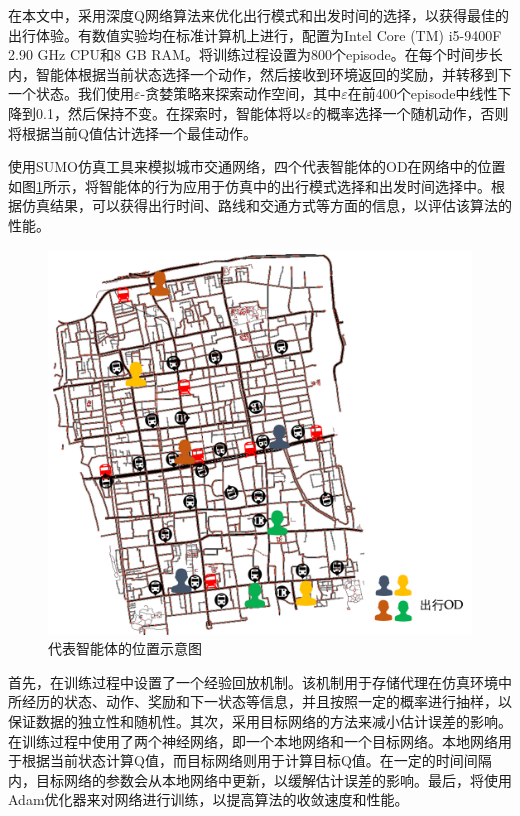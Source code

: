 在本文中，采用深度Q网络算法来优化出行模式和出发时间的选择，以获得最佳的出行体验。有数值实验均在标准计算机上进行，配置为Intel Core (TM) i5-9400F 2.90 GHz CPU和8 GB RAM。将训练过程设置为800个episode。在每个时间步长内，智能体根据当前状态选择一个动作，然后接收到环境返回的奖励，并转移到下一个状态。我们使用$\varepsilon$-贪婪策略来探索动作空间，其中$\varepsilon$在前400个episode中线性下降到0.1，然后保持不变。在探索时，智能体将以$\varepsilon$的概率选择一个随机动作，否则将根据当前Q值估计选择一个最佳动作。

使用SUMO仿真工具来模拟城市交通网络，四个代表智能体的OD在网络中的位置如图\ref{agent_map}所示，将智能体的行为应用于仿真中的出行模式选择和出发时间选择中。根据仿真结果，可以获得出行时间、路线和交通方式等方面的信息，以评估该算法的性能。
\begin{figure}
  \centering
  \includegraphics[width=.75\linewidth]{figures/content/agent_map.png}
  \caption{代表智能体的位置示意图}
  \label{agent_map}
\end{figure}

首先，在训练过程中设置了一个经验回放机制。该机制用于存储代理在仿真环境中所经历的状态、动作、奖励和下一状态等信息，并且按照一定的概率进行抽样，以保证数据的独立性和随机性。其次，采用目标网络的方法来减小估计误差的影响。在训练过程中使用了两个神经网络，即一个本地网络和一个目标网络。本地网络用于根据当前状态计算Q值，而目标网络则用于计算目标Q值。在一定的时间间隔内，目标网络的参数会从本地网络中更新，以缓解估计误差的影响。最后，将使用Adam优化器来对网络进行训练，以提高算法的收敛速度和性能。


